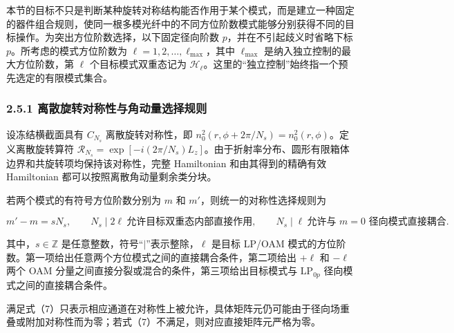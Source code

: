 \documentclass[
  UTF8,
  zihao=-4,
  fontset=fandol]{ctexart}
\begin{document}
本节的目标不只是判断某种旋转对称结构能否作用于某个模式，而是建立一种固定的器件组合规则，使同一根多模光纤中的不同方位阶数模式能够分别获得不同的目标操作。为突出方位阶数选择，以下固定径向阶数
\(p\)，并在不引起歧义时省略下标 \(p\)。所考虑的模式方位阶数为
\(\ell=1,2,\ldots,\ell_{\max}\)，其中 \(\ell_{\max}\)
是纳入独立控制的最大方位阶数，第 \(\ell\) 个目标模式双重态记为
\(\mathcal H_\ell\)。这里的``独立控制''始终指一个预先选定的有限模式集合。

\hypertarget{ux79bbux6563ux65cbux8f6cux5bf9ux79f0ux6027ux4e0eux89d2ux52a8ux91cfux9009ux62e9ux89c4ux5219}{%
\subsubsection{2.5.1
离散旋转对称性与角动量选择规则}\label{ux79bbux6563ux65cbux8f6cux5bf9ux79f0ux6027ux4e0eux89d2ux52a8ux91cfux9009ux62e9ux89c4ux5219}}

设冻结横截面具有 \(C_{N_s}\) 离散旋转对称性，即
\(n_0^2(r,\phi+2\pi/N_s)=n_0^2(r,\phi)\)。定义离散旋转算符
\(\mathscr R_{N_s}=\exp[-i(2\pi/N_s)L_z]\)。由于折射率分布、圆形有限箱体边界和共旋转项均保持该对称性，完整
Hamiltonian 和由其得到的精确有效 Hamiltonian
都可以按照离散角动量剩余类分块。

若两个模式的有符号方位阶数分别为 \(m\) 和
\(m'\)，则统一的对称性选择规则为

\[
m'-m=sN_s,\qquad
N_s\mid2\ell\ \text{允许目标双重态内部直接作用},\qquad
N_s\mid\ell\ \text{允许与 }m=0\text{ 径向模式直接耦合}.
\tag{7}
\]

其中，\(s\in\mathbb Z\) 是任意整数，符号``\(\mid\)''表示整除，\(\ell\)
是目标 LP/OAM
模式的方位阶数。第一项给出任意两个方位模式之间的直接耦合条件，第二项给出
\(+\ell\) 和 \(-\ell\) 两个 OAM
分量之间直接分裂或混合的条件，第三项给出目标模式与 \(\mathrm{LP}_{0p}\)
径向模式之间的直接耦合条件。

满足式（7）只表示相应通道在对称性上被允许，具体矩阵元仍可能由于径向场重叠或附加对称性而为零；若式（7）不满足，则对应直接矩阵元严格为零。
\end{document}

